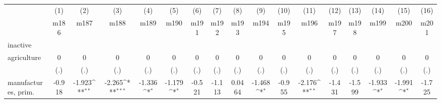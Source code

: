 {
\def\sym#1{\ifmmode^{#1}\else\(^{#1}\)\fi}
\begin{tabular}{l*{16}{c}}
\hline\hline
                    &\multicolumn{1}{c}{(1)}&\multicolumn{1}{c}{(2)}&\multicolumn{1}{c}{(3)}&\multicolumn{1}{c}{(4)}&\multicolumn{1}{c}{(5)}&\multicolumn{1}{c}{(6)}&\multicolumn{1}{c}{(7)}&\multicolumn{1}{c}{(8)}&\multicolumn{1}{c}{(9)}&\multicolumn{1}{c}{(10)}&\multicolumn{1}{c}{(11)}&\multicolumn{1}{c}{(12)}&\multicolumn{1}{c}{(13)}&\multicolumn{1}{c}{(14)}&\multicolumn{1}{c}{(15)}&\multicolumn{1}{c}{(16)}\\
                    &\multicolumn{1}{c}{m186}&\multicolumn{1}{c}{m187}&\multicolumn{1}{c}{m188}&\multicolumn{1}{c}{m189}&\multicolumn{1}{c}{m190}&\multicolumn{1}{c}{m191}&\multicolumn{1}{c}{m192}&\multicolumn{1}{c}{m193}&\multicolumn{1}{c}{m194}&\multicolumn{1}{c}{m195}&\multicolumn{1}{c}{m196}&\multicolumn{1}{c}{m197}&\multicolumn{1}{c}{m198}&\multicolumn{1}{c}{m199}&\multicolumn{1}{c}{m200}&\multicolumn{1}{c}{m201}\\
\hline
inactive            &                     &                     &                     &                     &                     &                     &                     &                     &                     &                     &                     &                     &                     &                     &                     &                     \\
agriculture         &           0         &           0         &           0         &           0         &           0         &           0         &           0         &           0         &           0         &           0         &           0         &           0         &           0         &           0         &           0         &           0         \\
                    &         (.)         &         (.)         &         (.)         &         (.)         &         (.)         &         (.)         &         (.)         &         (.)         &         (.)         &         (.)         &         (.)         &         (.)         &         (.)         &         (.)         &         (.)         &         (.)         \\
[1em]
manufactures, prim. &      -0.918         &      -1.923\sym{**} &      -2.265\sym{***}&      -1.336\sym{*}  &      -1.179\sym{*}  &      -0.521         &      -1.113         &      0.0464         &      -1.468\sym{*}  &      -0.955         &      -2.176\sym{**} &      -1.431         &      -1.599         &      -1.933\sym{*}  &      -1.991\sym{*}  &      -1.725         \\

\end{tabular}}
